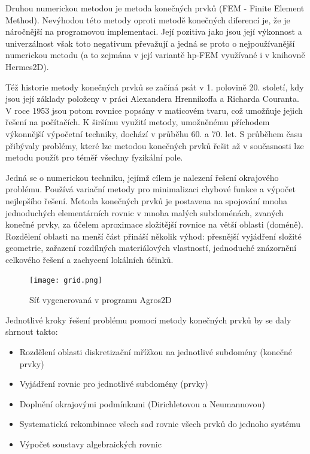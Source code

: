 \documentclass[12pt,a4paper,oneside]{article}
\numberwithin{equation}{section} %
\numberwithin{figure}{section} %
\numberwithin{table}{section} %
\begin{document}
Druhou numerickou metodou je metoda konečných prvků (FEM - Finite Element Method). Nevýhodou této metody oproti metodě konečných diferencí je, že je náročnější na programovou implementaci. Její pozitiva jako jsou její výkonnost a univerzálnost však toto negativum převažují a jedná se proto o nejpoužívanější numerickou metodu (a to zejmána v její variantě hp-FEM využívané i v knihovně Hermes2D). 

Též historie metody konečných prvků se začíná psát v 1. polovině 20. století, kdy jsou její základy položeny v práci Alexandera Hrennikoffa a Richarda Couranta. V roce 1953 jsou potom rovnice popsány v maticovém tvaru, což umožňuje jejich řešení na počítačích. K širšímu využití metody, umožněnému příchodem výkonnější výpočetní techniky, dochází v průběhu 60. a 70. let. S průběhem času přibývaly problémy, které lze metodou konečných prvků řešit až v současnosti lze metodu použít pro téměř všechny fyzikální pole.

Jedná se o numerickou techniku, jejímž cílem je nalezení řešení okrajového problému. Používá variační metody pro minimalizaci chybové funkce a výpočet nejlepšího řešení. Metoda konečných prvků je postavena na spojování mnoha jednoduchých elementárních rovnic v mnoha malých subdoménách, zvaných konečné prvky, za účelem aproximace složitější rovnice na větší oblasti (doméně). Rozdělení oblasti na menší část přináší několik výhod: přesnější vyjádření složité geometrie, zařazení rozdílných materiálových vlastností, jednoduché znázornění celkového řešení a zachycení lokálních účinků. 

\begin{figure}[h] %
\begin{center}
\texttt{[image: grid.png]} %
\caption{Síť vygenerovaná v programu Agros2D} %
\end{center}
\end{figure}

Jednotlivé kroky řešení problému pomocí metody konečných prvků by se daly shrnout takto:
\begin{itemize}
\item Rozdělení oblasti diskretizační mřížkou  na jednotlivé subdomény (konečné prvky)
\item Vyjádření rovnic pro jednotlivé subdomény (prvky)
\item Doplnění okrajovými podmínkami (Dirichletovou a Neumannovou)
\item Systematická rekombinace všech sad rovnic všech prvků do jednoho systému
\item Výpočet soustavy algebraických rovnic
\end{itemize}
\end{document}
